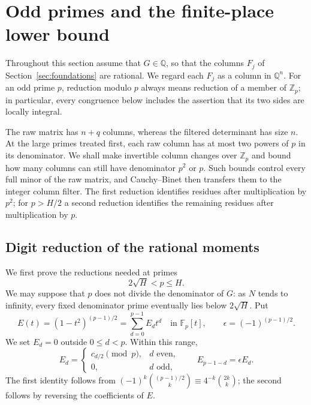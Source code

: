 \section{Odd primes and the finite-place lower bound}
\label{sec:odd-primes}

Throughout this section assume that $G\in\mathbb Q$, so that the columns
$F_j$ of Section~\ref{sec:foundations} are rational.  We regard each $F_j$
as a column in $\mathbb Q^n$.  For an odd prime $p$, reduction modulo $p$
always means reduction of a member of $\mathbb Z_p$; in particular, every
congruence below includes the assertion that its two sides are locally
integral.

The raw matrix has $n+q$ columns, whereas the filtered determinant has
size $n$.  At the large primes treated first, each raw column has at most
two powers of $p$ in its denominator.  We shall make invertible column
changes over $\mathbb Z_p$ and bound how many columns can still have
denominator $p^2$ or $p$.  Such bounds control every full minor of the
raw matrix, and Cauchy--Binet then transfers them to the integer column
filter.  The first reduction identifies residues after multiplication
by $p^2$; for $p>H/2$ a second reduction identifies the remaining
residues after multiplication by $p$.

\subsection{Digit reduction of the rational moments}

We first prove the reductions needed at primes
\[
  2\sqrt H<p\le H.
\]
We may suppose that $p$ does not divide the denominator of $G$: as $N$
tends to infinity, every fixed denominator prime eventually lies below
$2\sqrt H$.  Put
\[
 E(t)=(1-t^2)^{(p-1)/2}=\sum_{d=0}^{p-1}E_dt^d
 \quad\text{in }\mathbb F_p[t],\qquad
 \epsilon=(-1)^{(p-1)/2}.
\]
We set $E_d=0$ outside $0\le d<p$.  Within this range,
\[
 E_d=\begin{cases}c_{d/2}\pmod p,&d\text{ even},\\0,&d\text{ odd},\end{cases}
 \qquad E_{p-1-d}=\epsilon E_d.
\]
The first identity follows from
$(-1)^k\binom{(p-1)/2}{k}\equiv4^{-k}\binom{2k}{k}$; the second follows
by reversing the coefficients of $E$.


